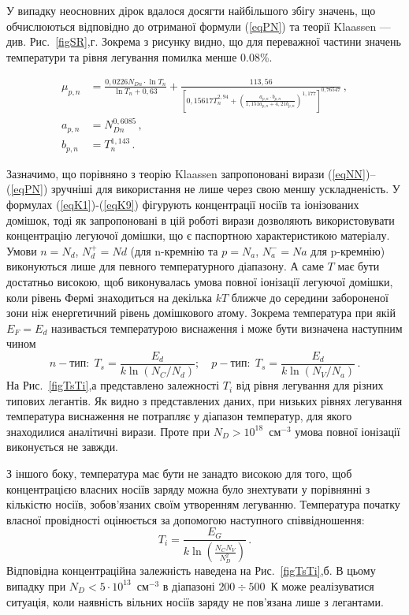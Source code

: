 \documentclass[12pt,a4paper,titlepage,oneside]{book}
\numberwithin{equation}{part}
\begin{document}
У випадку неосновних дірок вдалося досягти найбільшого збігу значень,
що обчислюються відповідно до отриманої формули (\ref{eqPN})  та теорії Klaassen --- див. Рис.~\ref{figSR},г.
Зокрема з рисунку видно, що для переважної частини значень температури та рівня легування помилка менше 0.08\%.

\begin{subequations} \label{eqPN}
    \begin{align}
      \mu_{p,n}& =\frac{0,0226N_{Dn}\cdot\ln T_n}{\ln T_n+0,63}
      +\frac{113,56}{\left[0,15617T_n^{2,94}+\left(\frac{a_{p,n}\cdot b_{p,n}}{1,151a_{p,n}+ 4,21 b_{p,n}}\right)^{1,177}\right]^{0,76547}}\,, \label{eqPNa} \\
      a_{p,n} &=N_{Dn}^{0,6085}\,, \label{eqPNb} \\
      b_{p,n}& =T_n^{1,143}\,. \label{eqPNc}
    \end{align}
\end{subequations}

Зазначимо, що порівняно з теорію Klaassen запропоновані вирази (\ref{eqNN})--(\ref{eqPN}) зручніші для використання не лише через свою меншу ускладненість.
У формулах (\ref{eqK1})-(\ref{eqK9}) фігурують концентрації носіїв та іонізованих домішок, тоді як запропоновані в цій роботі вирази
дозволяють використовувати концентрацію легуючої домішки, що є паспортною характеристикою матеріалу.
Умови $n=N_d$, $N_d^+=Nd$ (для n-кремнію та $p=N_a$, $N_a^-=Na$ для p-кремнію) виконуються лише для певного температурного діапазону.
А саме $T$ має бути достатньо високою, щоб виконувалась умова повної іонізації легуючої домішки,
коли рівень Фермі знаходиться на декілька $kT$ ближче до середини забороненої зони
ніж енергетичний рівень домішкового атому.
Зокрема температура при якій $E_F=E_d$ називається температурою виснаження і може бути визначена наступним чином
\begin{equation}\label{eqTs}
  n-\text{тип}:\;T_s=\frac{E_d}{k\ln(N_C/N_d)};\quad p-\text{тип}:\;T_s=\frac{E_d}{k\ln(N_V/N_a)}\,.
\end{equation}
На Рис.~\ref{figTsTi},а представлено залежності $T_i$ від рівня легування для різних типових легантів.
Як видно з представлених даних, при низьких рівнях легування температура виснаження не потрапляє
у діапазон температур, для якого знаходилися аналітичні вирази.
Проте при $N_D>10^{18}$~см$^{-3}$ умова повної іонізації виконується не завжди.



З іншого боку, температура має бути не занадто високою для того, щоб концентрацією власних носіїв заряду можна було знехтувати
у порівнянні з кількістю носіїв, зобов'язаних своїм утворенням легуванню.
Температура початку власної провідності оцінюється за допомогою наступного співвідношення:
\begin{equation}\label{eqTi}
  T_i=\frac{E_G}{k \ln\left(\frac{N_C N_V}{N_D^2}\right)}\,.
\end{equation}
Відповідна концентраційна залежність наведена на Рис.~\ref{figTsTi},б.
В цьому випадку при $N_D<5\cdot 10^{13}$~см$^{-3}$ в діапазоні $200\div500$~К може реалізуватися ситуація,
коли наявність вільних носіїв заряду не пов'язана лише з легантами.
\end{document}
